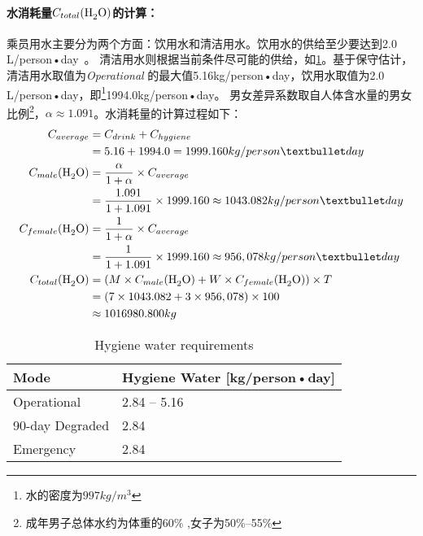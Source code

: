 \documentclass[a4paper]{standalone}
\begin{document}

\def\Water{\ce{H2O}}
\def\WaterConsume{\TotalConsume[\Water]}
\def\WaterUnitKg{kg/person•day}
\def\WaterUnitL{L/person•day}
\def\DrinkWater{1994.0}
\def\HygieneWater{5.16}
\def\WaterAve{1999.160}
\def\MaleWater{1043.082}
\def\FemaleWater{956,078}
\def\TotalWater{1016980.800}
\def\WaterRatio{1.091}

\paragraph{水消耗量$\WaterConsume$的计算：}

乘员用水主要分为两个方面：饮用水和清洁用水。饮用水的供给至少要达到2.0 \WaterUnitL\ 。
清洁用水则根据当前条件尽可能的供给，如\cref{tab:HygieneWater}。基于保守估计，清洁用水取值为\emph{Operational}
的最大值\HygieneWater \WaterUnitKg ，饮用水取值为2.0 \WaterUnitL ，即\footnote{水的密度为$997 kg/m^3$}\DrinkWater \WaterUnitKg 。
男女差异系数取自人体含水量的男女比例\footnote{成年男子总体水约为体重的60\% ,女子为50\%--55\%}，$\alpha \approx \WaterRatio$。水消耗量的计算过程如下：
\begin{align*}
  \Average &= C_{drink} + C_{hygiene} \\
           &= \HygieneWater + \DrinkWater = \WaterAve \WaterUnitKg \\
  \MaleConsume[\Water] &= \MaleConsumeEq  \\
                       &= \frac{\WaterRatio}{1+\WaterRatio} \times \WaterAve \approx \MaleWater \WaterUnitKg \\
  \FemaleConsume[\Water] &= \FemaleConsumeEq \\
                         &= \frac{1}{1+\WaterRatio} \times \WaterAve \approx \FemaleWater \WaterUnitKg \\
  \WaterConsume &= (M \times \MaleConsume[\Water] + W \times \FemaleConsume[\Water]) \times T \\
                &= (\MaleNumer \times \MaleWater + \FemaleNumber \times \FemaleWater) \times \TotalDays \\
                &\approx \TotalWater kg
\end{align*}

\begin{table}[H]
  \caption{ Hygiene water requirements }
  \centering
  \label{tab:HygieneWater}
  \begin{tabularx}{\textwidth}{|X|X|}
    \hline
    Mode & Hygiene Water [\WaterUnitKg] \tabularnewline\hline
    Operational & 2.84 -- 5.16 \tabularnewline\hline
    90-day Degraded & 2.84 \tabularnewline\hline
    Emergency & 2.84 \tabularnewline\hline
  \end{tabularx}
\end{table}
\end{document}
